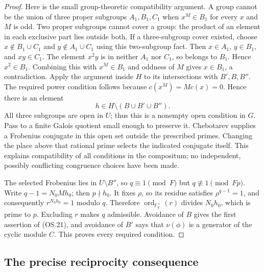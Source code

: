\begin{proof}
Here is the small group-theoretic compatibility argument.
A group cannot be the union of three proper subgroups $A_1,B_1,C_1$
when $x^M\in B_1$ for every $x$ and $M$ is odd.
Two proper subgroups cannot cover a group: the product of an element
in each exclusive part lies outside both.
If a three-subgroup cover existed, choose
$x\notin B_1\cup C_1$ and $y\notin A_1\cup C_1$ using this
two-subgroup fact.  Then $x\in A_1$, $y\in B_1$, and $xy\in C_1$.
The element $x^2y$ is in neither $A_1$ nor $C_1$, so belongs to
$B_1$.  Hence $x^2\in B_1$.  Combining this with $x^M\in B_1$
and oddness of $M$ gives $x\in B_1$, a contradiction.
Apply the argument inside $H$ to its intersections with $B',B,B''$.
The required power condition follows because $c(x^M)=Mc(x)=0$.
Hence there is an element
\[
                         h\in H\setminus(B\cup B'\cup B'').
\]
All three subgroups are open in $U$; thus this is a nonempty open
condition in $G$.  Pass to a finite Galois quotient small enough
to preserve it.  Chebotarev supplies a Frobenius conjugate in this
open set outside the prescribed primes.  Changing the place above
that rational prime selects the indicated conjugate itself.
This explains compatibility of all conditions in the compositum;
no independent, possibly conflicting congruence choices have been
made.

The selected Frobenius lies in $U\setminus B''$, so
$q\equiv1\pmod F$ but $q\not\equiv1\pmod{Fp}$.
Write $q-1=N_0M h_0$; then $p\nmid h_0$.
It fixes $\rho$, so its residue satisfies $\rho^{q-1}=1$,
and consequently $r^{N_0h_0}=1$ modulo $q$.
Therefore $\operatorname{ord}_{\mathbb F_q^\times}(r)$ divides
$N_0h_0$, which is prime to $p$.  Excluding $r$ makes $q$
admissible.  Avoidance of $B$ gives the first assertion of (OS.21),
and avoidance of $B'$ says that $\nu(\phi)$ is a generator of
the cyclic module $C$.  This proves every required condition.
\end{proof}

\subsection{The precise reciprocity consequence}

